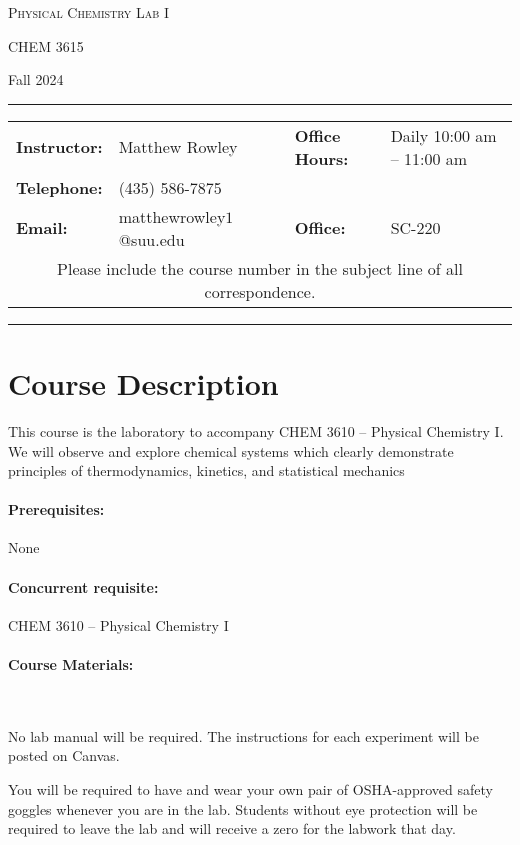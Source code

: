 \documentclass[12pt, letterpaper]{article}
\begin{document}
\begin{center}
	{\Large \textsc{Physical Chemistry Lab I}}

	CHEM 3615
\end{center}

\begin{center}
	{\large Fall 2024}
\end{center}
\begin{center}
	\rule{0.99\textwidth}{0.4pt}
	\begin{tabular}{llcll}
		\textbf{Instructor:} & Matthew Rowley           &  & \textbf{Office Hours:} & Daily 10:00 am -- 11:00 am \\
		\textbf{Telephone:}  & (435) 586-7875           &  &                        &  \\
		\textbf{Email:}      & matthewrowley$1$@suu.edu &  & \textbf{Office:}       & SC-220                   \\
		\multicolumn{5}{c}{Please include the course number in the subject line of all correspondence.}
	\end{tabular}
	\rule{0.99\textwidth}{0.4pt}
\end{center}


\section*{Course Description}
This course is the laboratory to accompany CHEM 3610 -- Physical Chemistry I. We will observe and explore chemical systems which clearly demonstrate principles of thermodynamics, kinetics, and statistical mechanics

\paragraph{Prerequisites:}
None

\paragraph{Concurrent requisite:}
CHEM 3610 -- Physical Chemistry I

\paragraph{Course Materials:} ~

\noindent No lab manual will be required. The instructions for each experiment will be posted on Canvas.

\noindent You will be required to have and wear your own pair of OSHA-approved safety goggles whenever you are in the lab. Students without eye protection will be required to leave the lab and will receive a zero for the labwork that day.
\end{document}
